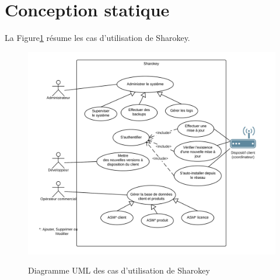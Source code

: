 \documentclass{themeensg}
\begin{document}
\section{Conception statique}
La Figure\ref{fig:use_case} résume les cas d'utilisation de Sharokey.

\begin{figure}[h!]
\centering
\includegraphics[scale=1]{images/use_case_sharokey.png}
\label{fig:use_case}
\caption{Diagramme UML des cas d'utilisation de Sharokey}
\end{figure}
\end{document}
